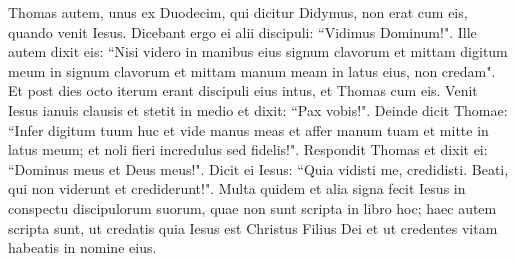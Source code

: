 \begin{biblechapter}
\verse Thomas autem, unus ex Duodecim, qui dicitur Didymus, non erat cum eis, quando venit Iesus. 
\verse Dicebant ergo ei alii discipuli: “Vidimus Dominum!". Ille autem dixit eis: “Nisi videro in manibus eius signum clavorum et mittam digitum meum in signum clavorum et mittam manum meam in latus eius, non credam". 
\verse Et post dies octo iterum erant discipuli eius intus, et Thomas cum eis. Venit Iesus ianuis clausis et stetit in medio et dixit: “Pax vobis!". 
\verse Deinde dicit Thomae: “Infer digitum tuum huc et vide manus meas et affer manum tuam et mitte in latus meum; et noli fieri incredulus sed fidelis!". 
\verse Respondit Thomas et dixit ei: “Dominus meus et Deus meus!". 
\verse Dicit ei Iesus: “Quia vidisti me, credidisti. Beati, qui non viderunt et crediderunt!". 
\verse Multa quidem et alia signa fecit Iesus in conspectu discipulorum suorum, quae non sunt scripta in libro hoc; 
\verse haec autem scripta sunt, ut credatis quia Iesus est Christus Filius Dei et ut credentes vitam habeatis in nomine eius. 
\end{biblechapter}

